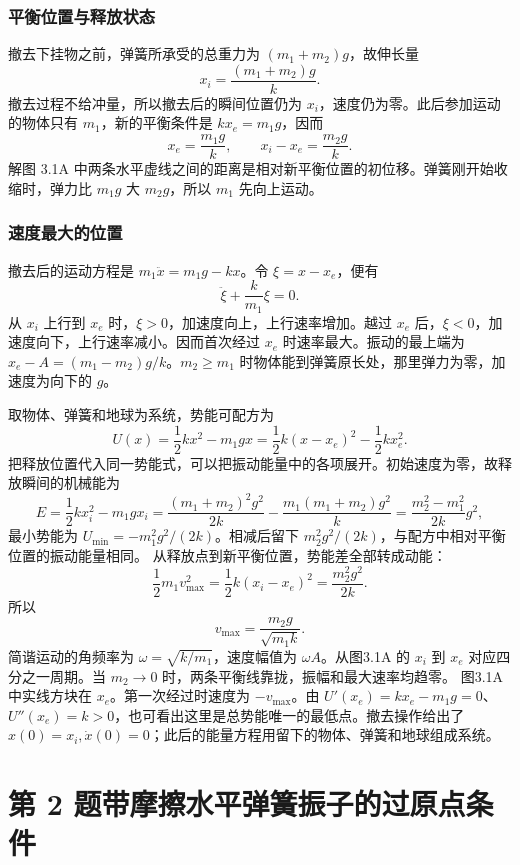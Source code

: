 \documentclass[UTF8,fontset=fandol,a4paper,11pt]{ctexart}
\begin{document}
\subsubsection*{平衡位置与释放状态}
撤去下挂物之前，弹簧所承受的总重力为 $(m_1+m_2)g$，故伸长量
\[
x_i=\frac{(m_1+m_2)g}{k}.
\]
撤去过程不给冲量，所以撤去后的瞬间位置仍为 $x_i$，速度仍为零。此后参加运动的物体只有 $m_1$，新的平衡条件是 $kx_e=m_1g$，因而
\[
x_e=\frac{m_1g}{k},\qquad x_i-x_e=\frac{m_2g}{k}.
\]
解图 3.1A 中两条水平虚线之间的距离是相对新平衡位置的初位移。弹簧刚开始收缩时，弹力比 $m_1g$ 大 $m_2g$，所以 $m_1$ 先向上运动。

\subsubsection*{速度最大的位置}
撤去后的运动方程是 $m_1\ddot x=m_1g-kx$。令 $\xi=x-x_e$，便有
\[
\ddot\xi+\frac{k}{m_1}\xi=0.
\]
从 $x_i$ 上行到 $x_e$ 时，$\xi>0$，加速度向上，上行速率增加。越过 $x_e$ 后，$\xi<0$，加速度向下，上行速率减小。因而首次经过 $x_e$ 时速率最大。振动的最上端为 $x_e-A=(m_1-m_2)g/k$。$m_2\ge m_1$ 时物体能到弹簧原长处，那里弹力为零，加速度为向下的 $g$。

取物体、弹簧和地球为系统，势能可配方为
\[
U(x)=\frac12kx^2-m_1gx
=\frac12k(x-x_e)^2-\frac12kx_e^2.
\]
把释放位置代入同一势能式，可以把振动能量中的各项展开。初始速度为零，故释放瞬间的机械能为
\[
E=\frac12kx_i^2-m_1gx_i
=\frac{(m_1+m_2)^2g^2}{2k}
-\frac{m_1(m_1+m_2)g^2}{k}
=\frac{m_2^2-m_1^2}{2k}g^2,
\]
最小势能为 $U_{\min}=-m_1^2g^2/(2k)$。相减后留下 $m_2^2g^2/(2k)$，与配方中相对平衡位置的振动能量相同。
从释放点到新平衡位置，势能差全部转成动能：
\[
\frac12m_1v_{\max}^2
 =\frac12k(x_i-x_e)^2
 =\frac{m_2^2g^2}{2k}.
\]
所以
\[
\boxed{v_{\max}=\frac{m_2g}{\sqrt{m_1k}}}.
\]
简谐运动的角频率为 $\omega=\sqrt{k/m_1}$，速度幅值为 $\omega A$。从图3.1A 的 $x_i$ 到 $x_e$ 对应四分之一周期。当 $m_2\to0$ 时，两条平衡线靠拢，振幅和最大速率均趋零。
图3.1A 中实线方块在 $x_e$。第一次经过时速度为 $-v_{\max}$。由 $U'(x_e)=kx_e-m_1g=0$、$U''(x_e)=k>0$，也可看出这里是总势能唯一的最低点。撤去操作给出了 $x(0)=x_i,\dot x(0)=0$；此后的能量方程用留下的物体、弹簧和地球组成系统。




\section*{第 2 题\quad 带摩擦水平弹簧振子的过原点条件}
\end{document}
